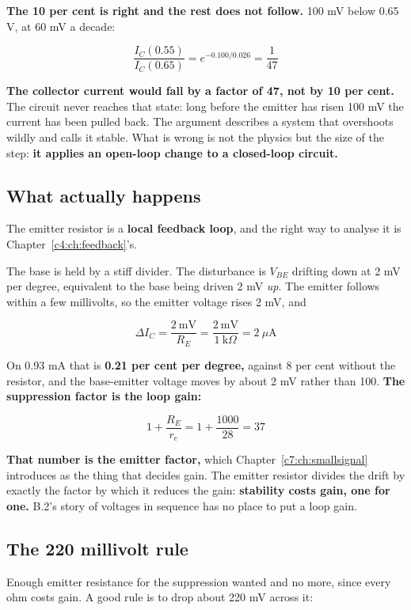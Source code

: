 \textbf{The 10 per cent is right and the rest does not follow.} 100 mV below 0.65 V, at 60 mV a decade:

\[
  \frac{I_C(0.55)}{I_C(0.65)} = e^{-0.100/0.026} = \frac{1}{47}
\]

\textbf{The collector current would fall by a factor of 47, not by 10 per cent.} The circuit never reaches that state: long before the emitter has risen 100 mV the current has been pulled back. The argument describes a system that overshoots wildly and calls it stable. What is wrong is not the physics but the size of the step: \textbf{it applies an open-loop change to a closed-loop circuit.}

\subsection{What actually happens}
\label{c6:sec:b3}
The emitter resistor is a \textbf{local feedback loop}, and the right way to analyse it is Chapter~\ref{c4:ch:feedback}'s.

The base is held by a stiff divider. The disturbance is $V_{BE}$ drifting down at 2 mV per degree, equivalent to the base being driven 2 mV \emph{up}. The emitter follows within a few millivolts, so the emitter voltage rises 2 mV, and

\[
  \Delta I_C = \frac{2\ \text{mV}}{R_E} = \frac{2\ \text{mV}}{1\ \text{k}\Omega} = 2\ \mu\text{A}
\]

On 0.93 mA that is \textbf{0.21 per cent per degree,} against 8 per cent without the resistor, and the base-emitter voltage moves by about 2 mV rather than 100. \textbf{The suppression factor is the loop gain:}

\[
  1 + \frac{R_E}{r_e} = 1 + \frac{1000}{28} = 37
\]


\textbf{That number is the emitter factor,} which Chapter~\ref{c7:ch:smallsignal} introduces as the thing that decides gain. The emitter resistor divides the drift by exactly the factor by which it reduces the gain: \textbf{stability costs gain, one for one.} B.2's story of voltages in sequence has no place to put a loop gain.

\subsection{The 220 millivolt rule}
\label{c6:sec:b4}
Enough emitter resistance for the suppression wanted and no more, since every ohm costs gain. A good rule is to drop about 220 mV across it:

